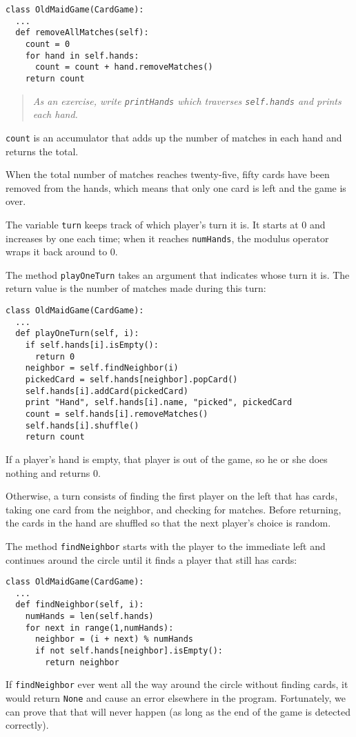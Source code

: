\beforeverb
\begin{verbatim}
class OldMaidGame(CardGame):
  ...
  def removeAllMatches(self):
    count = 0
    for hand in self.hands:
      count = count + hand.removeMatches()
    return count
\end{verbatim}
\afterverb
%
\begin{quote}
{\em As an exercise, write {\tt printHands} which traverses
{\tt self.hands} and prints each hand.}
\end{quote}

{\tt count} is
an accumulator that adds up the number of matches in each
hand and returns the total.


When the total number of matches reaches twenty-five,
fifty cards have been removed from the hands, which means that
only one card is left and the game is over.

The variable {\tt turn} keeps track of which player's turn
it is.  It starts at 0 and increases by one each time;
when it reaches {\tt numHands}, the modulus operator
wraps it back around to 0.

The method {\tt playOneTurn} takes an argument that indicates
whose turn it is.  The return value is the number of matches
made during this turn:

\pagebreak

\beforeverb
\begin{verbatim}
class OldMaidGame(CardGame):
  ...
  def playOneTurn(self, i):
    if self.hands[i].isEmpty():
      return 0
    neighbor = self.findNeighbor(i)
    pickedCard = self.hands[neighbor].popCard()
    self.hands[i].addCard(pickedCard)
    print "Hand", self.hands[i].name, "picked", pickedCard
    count = self.hands[i].removeMatches()
    self.hands[i].shuffle()
    return count
\end{verbatim}
\afterverb
%
If a player's hand is empty, that player is out of the game, so he or she
does nothing and returns 0.

Otherwise, a turn consists of finding the first player on the left
that has cards, taking one card from the neighbor, and checking
for matches.  Before returning, the cards in the hand are shuffled
so that the next player's choice is random.

The method {\tt findNeighbor} starts with the player to the
immediate left and continues around the circle until it finds
a player that still has cards:

\beforeverb
\begin{verbatim}
class OldMaidGame(CardGame):
  ...
  def findNeighbor(self, i):
    numHands = len(self.hands)
    for next in range(1,numHands):
      neighbor = (i + next) % numHands
      if not self.hands[neighbor].isEmpty():
        return neighbor
\end{verbatim}
\afterverb
%
If {\tt findNeighbor} ever went all the way around the circle without
finding cards, it would return {\tt None} and cause an error
elsewhere in the program.  Fortunately, we can prove that that will
never happen (as long as the end of the game is detected correctly).

